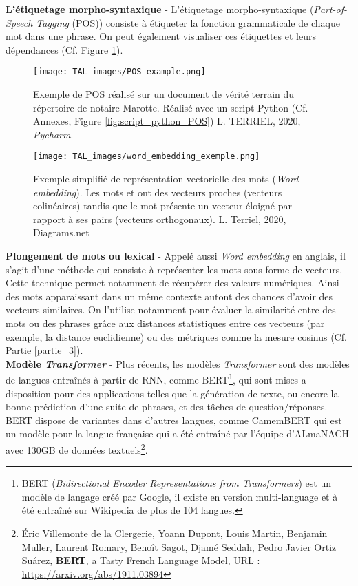 \newpage
\textbf{L'étiquetage morpho-syntaxique} - L'étiquetage morpho-syntaxique (\textit{Part-of-Speech Tagging} (POS)) consiste à étiqueter la fonction grammaticale de chaque mot dans une phrase. On peut également visualiser ces étiquettes et leurs dépendances (Cf. Figure \ref{fig:NER}).  
\begin{figure}[h]\hspace{-1cm}
    \texttt{[image: TAL\_images/POS\_example.png]}
    \caption{Exemple de POS réalisé sur un document de vérité terrain du répertoire de notaire Marotte. Réalisé avec un script Python (Cf. Annexes, Figure \ref{fig:script_python_POS})  \textcopyright L. TERRIEL, 2020, \textit{Pycharm}.}
    \label{fig:NER}
\end{figure}

\begin{wrapfigure}[15]{r}{9cm}
    \centering
    \texttt{[image: TAL\_images/word\_embedding\_exemple.png]}
    \caption{Exemple simplifié de représentation vectorielle des mots (\textit{Word embedding}). Les mots  et  ont des vecteurs proches (vecteurs colinéaires) tandis que le mot  présente un vecteur éloigné par rapport à ses pairs (vecteurs orthogonaux). \textcopyright L. Terriel, 2020, Diagrams.net}
    \label{fig:word_embedding}
\end{wrapfigure}

\textbf{Plongement de mots ou lexical} - Appelé aussi \textit{Word embedding} en anglais, il s'agit d'une méthode qui consiste à représenter les mots sous forme de vecteurs. Cette technique permet notamment de récupérer des valeurs numériques. Ainsi des mots apparaissant dans un même contexte autont des chances d'avoir des vecteurs similaires. On l'utilise notamment pour évaluer la similarité entre des mots ou des phrases grâce aux distances statistiques entre ces vecteurs (par exemple, la distance euclidienne) ou des métriques comme la mesure cosinus (Cf. Partie \ref{partie_3}).\\

\textbf{Modèle \textit{Transformer}} - Plus récents, les modèles \textit{Transformer} sont des modèles de langues entraînés à partir de RNN, comme BERT\footnote{BERT (\textit{Bidirectional Encoder Representations from Transformers}) est un modèle de langage créé par Google, il existe en version multi-language et à été entraîné sur Wikipedia de plus de 104 langues.}, qui sont mises a disposition pour des applications telles que la génération de texte, ou encore la bonne prédiction d'une suite de phrases, et des tâches de question/réponses. BERT dispose de variantes dans d'autres langues, comme CamemBERT qui est un modèle pour la langue française qui a été entraîné par l'équipe d'ALmaNACH avec 130GB de données textuels\footnote{Éric Villemonte de la Clergerie, Yoann Dupont, Louis Martin, Benjamin Muller, Laurent Romary, Benoît Sagot, Djamé Seddah, Pedro Javier Ortiz Suárez, \textbf{BERT}, a Tasty French Language Model, URL : \url{https://arxiv.org/abs/1911.03894}}.\\  

